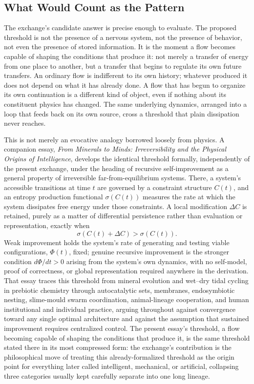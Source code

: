 \documentclass[11pt]{article}
\begin{document}
\subsection{What Would Count as the Pattern}

The exchange's candidate answer is precise enough to evaluate. The proposed threshold is not the presence of a nervous system, not the presence of behavior, not even the presence of stored information. It is the moment a flow becomes capable of shaping the conditions that produce it: not merely a transfer of energy from one place to another, but a transfer that begins to regulate its own future transfers. An ordinary flow is indifferent to its own history; whatever produced it does not depend on what it has already done. A flow that has begun to organize its own continuation is a different kind of object, even if nothing about its constituent physics has changed. The same underlying dynamics, arranged into a loop that feeds back on its own source, cross a threshold that plain dissipation never reaches.

This is not merely an evocative analogy borrowed loosely from physics. A companion essay, \emph{From Minerals to Minds: Irreversibility and the Physical Origins of Intelligence}, develops the identical threshold formally, independently of the present exchange, under the heading of recursive self-improvement as a general property of irreversible far-from-equilibrium systems. There, a system's accessible transitions at time $t$ are governed by a constraint structure $C(t)$, and an entropy production functional $\sigma(C(t))$ measures the rate at which the system dissipates free energy under those constraints. A local modification $\Delta C$ is retained, purely as a matter of differential persistence rather than evaluation or representation, exactly when
\[
\sigma(C(t) + \Delta C) > \sigma(C(t)).
\]
Weak improvement holds the system's rate of generating and testing viable configurations, $\Phi(t)$, fixed; genuine recursive improvement is the stronger condition $d\Phi/dt > 0$ arising from the system's own dynamics, with no self-model, proof of correctness, or global representation required anywhere in the derivation. That essay traces this threshold from mineral evolution and wet–dry tidal cycling in prebiotic chemistry through autocatalytic sets, membranes, endosymbiotic nesting, slime-mould swarm coordination, animal-lineage cooperation, and human institutional and individual practice, arguing throughout against convergence toward any single optimal architecture and against the assumption that sustained improvement requires centralized control. The present essay's threshold, a flow becoming capable of shaping the conditions that produce it, is the same threshold stated there in its most compressed form: the exchange's contribution is the philosophical move of treating this already-formalized threshold as the origin point for everything later called intelligent, mechanical, or artificial, collapsing three categories usually kept carefully separate into one long lineage.
\end{document}
